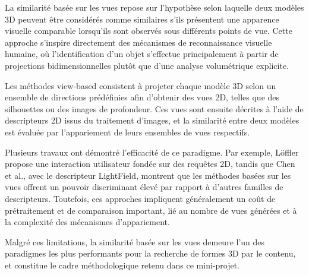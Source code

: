 \documentclass[11pt,a4paper,oneside]{report}
\begin{document}
La similarité basée sur les vues repose sur l’hypothèse selon laquelle deux modèles 3D peuvent être considérés comme similaires s’ils présentent une apparence visuelle comparable lorsqu’ils sont observés sous différents points de vue. Cette approche s’inspire directement des mécanismes de reconnaissance visuelle humaine, où l’identification d’un objet s’effectue principalement à partir de projections bidimensionnelles plutôt que d’une analyse volumétrique explicite.

Les méthodes view-based consistent à projeter chaque modèle 3D selon un ensemble de directions prédéfinies afin d’obtenir des vues 2D, telles que des silhouettes ou des images de profondeur. Ces vues sont ensuite décrites à l’aide de descripteurs 2D issus du traitement d’images, et la similarité entre deux modèles est évaluée par l’appariement de leurs ensembles de vues respectifs.

Plusieurs travaux ont démontré l’efficacité de ce paradigme. Par exemple, Löffler propose une interaction utilisateur fondée sur des requêtes 2D, tandis que Chen et al., avec le descripteur LightField, montrent que les méthodes basées sur les vues offrent un pouvoir discriminant élevé par rapport à d’autres familles de descripteurs. Toutefois, ces approches impliquent généralement un coût de prétraitement et de comparaison important, lié au nombre de vues générées et à la complexité des mécanismes d’appariement.

Malgré ces limitations, la similarité basée sur les vues demeure l’un des paradigmes les plus performants pour la recherche de formes 3D par le contenu, et constitue le cadre méthodologique retenu dans ce mini-projet.

\end{document}
